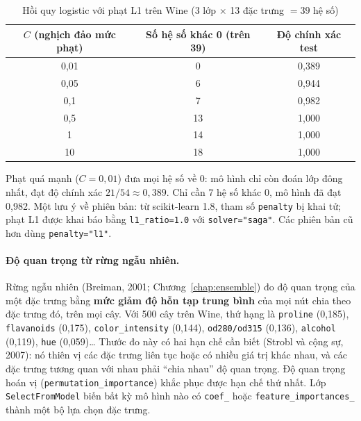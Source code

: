 
\begin{table}[H]
\centering
\begin{tabular}{|c|c|c|}
\hline
$C$ (nghịch đảo mức phạt) & \textbf{Số hệ số khác 0 (trên 39)} & \textbf{Độ chính xác test} \\
\hline
0,01 & 0 & 0,389 \\ \hline
0,05 & 6 & 0,944 \\ \hline
0,1 & 7 & 0,982 \\ \hline
0,5 & 13 & 1,000 \\ \hline
1 & 14 & 1,000 \\ \hline
10 & 18 & 1,000 \\ \hline
\end{tabular}
\caption{Hồi quy logistic với phạt L1 trên Wine (3 lớp $\times$ 13 đặc trưng $= 39$ hệ số)}
\label{tab:l1-wine}
\end{table}

Phạt quá mạnh ($C = 0{,}01$) đưa mọi hệ số về 0: mô hình chỉ còn đoán lớp đông nhất, đạt độ chính xác $21/54 \approx 0{,}389$. Chỉ cần 7 hệ số khác 0, mô hình đã đạt 0,982. Một lưu ý về phiên bản: từ scikit-learn 1.8, tham số \texttt{penalty} bị khai tử; phạt L1 được khai báo bằng \texttt{l1\_ratio=1.0} với \texttt{solver="saga"}. Các phiên bản cũ hơn dùng \texttt{penalty="l1"}.

\paragraph{Độ quan trọng từ rừng ngẫu nhiên.} Rừng ngẫu nhiên (Breiman, 2001; Chương~\ref{chap:ensemble}) đo độ quan trọng của một đặc trưng bằng \textbf{mức giảm độ hỗn tạp trung bình} của mọi nút chia theo đặc trưng đó, trên mọi cây. Với 500 cây trên Wine, thứ hạng là \texttt{proline} (0,185), \texttt{flavanoids} (0,175), \texttt{color\_intensity} (0,144), \texttt{od280/od315} (0,136), \texttt{alcohol} (0,119), \texttt{hue} (0,059)\ldots{} Thước đo này có hai hạn chế cần biết (Strobl và cộng sự, 2007): nó thiên vị các đặc trưng liên tục hoặc có nhiều giá trị khác nhau, và các đặc trưng tương quan với nhau phải ``chia nhau'' độ quan trọng. Độ quan trọng hoán vị (\texttt{permutation\_importance}) khắc phục được hạn chế thứ nhất. Lớp \texttt{SelectFromModel} biến bất kỳ mô hình nào có \texttt{coef\_} hoặc \texttt{feature\_importances\_} thành một bộ lựa chọn đặc trưng.

